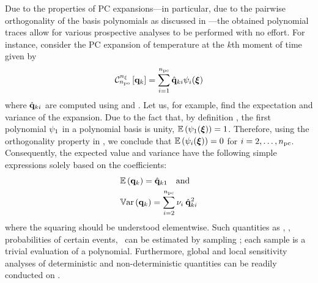 Due to the properties of PC expansions---in particular, due to the pairwise orthogonality of the basis polynomials as discussed in ---the obtained polynomial traces allow for various prospective analyses to be performed with no effort.
For instance, consider the PC expansion of temperature at the $k$th moment of time given by
\begin{equation} \elabel{pc-k}
  \oPC{\nvars}{\pcorder}{\vTO_k} = \sum_{i = 1}^{\pcterms} \pcc{\vTO}_{ki} \pcb_i(\vZ)
\end{equation}
where $\hat{\mathbf{q}}_{ki}$ are computed using  and . Let us, for example, find the expectation and variance of the expansion.
Due to the fact that, by definition \cite{xiu2010}, the first polynomial $\psi_1$ in a polynomial basis is unity, $\mathbb{E}\left(\psi_1(\boldsymbol{\xi})\right) = 1$.
Therefore, using the orthogonality property in , we conclude that $\mathbb{E}\left(\psi_i(\boldsymbol{\xi})\right) = 0$ for $i = 2, \dotsc, {n_\text{pc}}$.
Consequently, the expected value and variance have the following simple expressions solely based on the coefficients:
\begin{equation} \elabel{pc-moments}
\begin{aligned}
  & \oExp{\vTO_k} = \pcc{\vTO}_{k1} \hspace{1em} \text{and} \\
  & \oVar{\vTO_k} = \sum_{i = 2}^{\pcterms} \pcn_i \: \pcc{\vTO}_{ki}^2
\end{aligned}
\end{equation}
where the squaring should be understood elementwise.
Such quantities as \cdfs, \pdfs, probabilities of certain events, \etc\ can be estimated by sampling ; each sample is a trivial evaluation of a polynomial.
Furthermore, global and local sensitivity analyses of deterministic and non-deterministic quantities can be readily conducted on .
